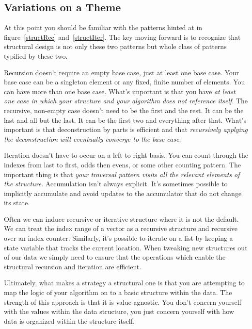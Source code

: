 \documentclass[nobib]{tufte-handout}
\begin{document}
\subsection{Variations on a Theme}

At this point you should be familiar with the patterns hinted at in figure~\ref{structRec} and~\ref{structIter}. The key moving forward is to recognize that structural design is not only these two patterns but whole class of patterns typified by these two.

Recursion doesn't require an empty base case, just at least one base case. Your base case can be a singleton element or any fixed, finite number of elements. You can have more than one base case. What's important is that you have \textit{at least one case in which your structure and your algorithm does not reference itself}. The recursive, non-empty case doesn't need to be the first and the rest. It can be the last and all but the last. It can be the first two and everything after that. What's important is that deconstruction by parts is efficient and that \textit{recursively applying the deconstruction will eventually converge to the base case}.

Iteration doesn't have to occur on a left to right basis. You can count through the indexes from last to first, odds then evens, or some other counting pattern. The important thing is that \textit{your traversal pattern visits all the relevant elements of the structure}.  Accumulation isn't always explicit. It's sometimes possible to implicitly accumulate and avoid updates to the accumulator that do not change its state.

Often we can induce recursive or iterative structure where it is not the default. We can treat the index range of a vector as a recursive structure and recursive over an index counter. Similarly, it's possible to iterate on a list by keeping a state variable that tracks the current location. When tweaking new structures out of our data we simply need to ensure that the operations which enable the structural recursion and iteration are efficient.

Ultimately, what makes a strategy a structural one is that you are attempting to map the logic of your algorithm on to a basic structure within the data. The strength of this approach is that it is value agnostic. You don't concern yourself with the values within the data structure, you just concern yourself with how data is organized within the structure itself.
\end{document}
